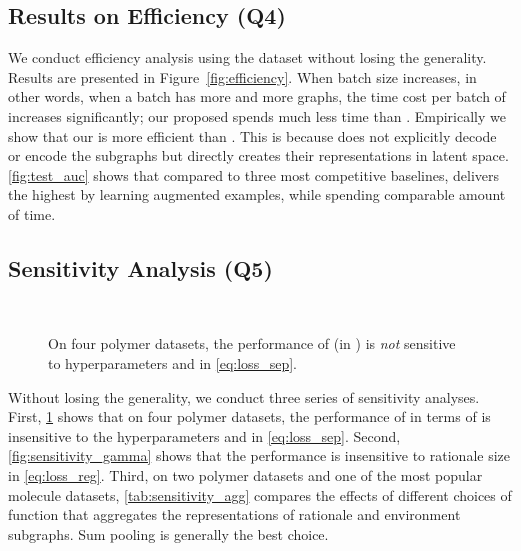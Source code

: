 \documentclass[sigconf]{acmart}
\begin{document}
\subsection{Results on Efficiency (Q4)}\label{sec:q4_efficiency}
We conduct efficiency analysis using the \hiv dataset without losing the generality. Results are presented in Figure~\ref{fig:efficiency}. When batch size increases, in other words, when a batch has more and more graphs, the time cost per batch of \dir increases significantly; our proposed \method spends much less time than \dir. Empirically we show that our \method is more efficient than \dir. This is because \method does not explicitly decode or encode the subgraphs but directly creates their representations in latent space.
\cref{fig:test_auc} shows that compared to three most competitive baselines, \method delivers the highest \classifyAUC by learning augmented examples, while spending comparable amount of time. 

\subsection{Sensitivity Analysis (Q5)}\label{sec:q5_sensitivity}
\begin{figure}[t]
    \centering
    \vspace{-0.15in}
    \hfill
    \\ \vspace{-0.15in}
    \hfill
    \vspace{-0.15in}
    \caption{On four polymer datasets, the performance of \method (in \regreRSquare) is \emph{not} sensitive to hyperparameters  and  in \cref{eq:loss_sep}.}
    \label{fig:loss_sensitivity}
    \vspace{-0.2in}
\end{figure}

Without losing the generality, we conduct three series of sensitivity analyses. First, \cref{fig:loss_sensitivity} shows that on four polymer datasets, the performance of \method in terms of \regreRSquare is insensitive to the hyperparameters  and  in \cref{eq:loss_sep}.
Second, \cref{fig:sensitivity_gamma} shows that the performance is insensitive to rationale size  in \cref{eq:loss_reg}.
Third, on two polymer datasets and one of the most popular molecule datasets, \cref{tab:sensitivity_agg} compares the effects of different choices of  function that aggregates the representations of rationale and environment subgraphs. Sum pooling is generally the best choice. 
\end{document}
